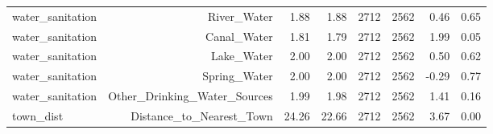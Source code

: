 \begin{table}[ht]
\begin{tabular}{lrrrrrrr}
  water_sanitation & River_Water & 1.88 & 1.88 & 2712 & 2562 & 0.46 & 0.65 \\ 
  water_sanitation & Canal_Water & 1.81 & 1.79 & 2712 & 2562 & 1.99 & 0.05 \\ 
  water_sanitation & Lake_Water & 2.00 & 2.00 & 2712 & 2562 & 0.50 & 0.62 \\ 
  water_sanitation & Spring_Water & 2.00 & 2.00 & 2712 & 2562 & -0.29 & 0.77 \\ 
  water_sanitation & Other_Drinking_Water_Sources & 1.99 & 1.98 & 2712 & 2562 & 1.41 & 0.16 \\ 
  town_dist & Distance_to_Nearest_Town & 24.26 & 22.66 & 2712 & 2562 & 3.67 & 0.00 \\ 
   \hline
\end{tabular}
\end{table}
